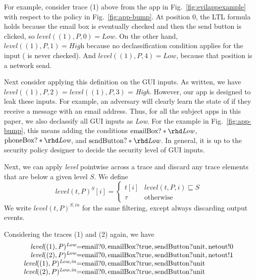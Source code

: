 \documentclass[10pt,conference,compsocconf]{IEEEtran}
\newcommand{\code}[1]{\text{\lstinline!#1!}}
\newcommand{\tr}{t\xspace}
\newcommand{\tlevel}[3]{\textit{level}(#1, #2, #3)}
\newcommand{\tleveltr}[2]{\textit{level}(#1, #2)}
\begin{document}
For example, consider trace (1) above from the app in
Fig.~\ref{fig:evilappexample} with respect to the policy in
Fig.~\ref{fig:app-bump}.  At position 0, the LTL formula holds because
the email box is eventually checked and then the send button is
clicked, so $\tlevel{(1)}{P}{0} = \textit{Low}$. On the other hand,
$\tlevel{(1)}{P}{1} = \textit{High}$ because no declassification
condition applies for the \code{phone} input (\code{phoneBox} is never
checked). And $\tlevel{(1)}{P}{4} = \textit{Low}$, because that
position is a network send.

Next consider applying this definition on the GUI inputs. As written,
we have $\tlevel{(1)}{P}{2}$ = $\tlevel{(1)}{P}{3}$ =
\textit{High}. However, our app is designed to leak these inputs. 
For example, an adversary will clearly learn the state of
\code{emailBox} if they receive a message with an email address. Thus,
for all the subject apps in this paper, we also declassify all GUI inputs as
\textit{Low}. 
For the example in Fig.~\ref{fig:app-bump}, this means
adding the conditions
$\code{emailBox?}\ast \rhd \textit{Low}$,
$\code{phoneBox?}\ast \rhd \textit{Low}$, and
$\code{sendButton?}\ast \rhd \textit{Low}$. In general, it is up to
the security policy designer to decide the security level of GUI inputs.

Next, we can apply \textit{level} pointwise across a trace and discard
any trace elements that are below a given level $S$. We define
\begin{displaymath}
\tleveltr{\tr}{P}^S[i] =
\begin{cases}
\tr[i] & \tlevel{\tr}{P}{i} \sqsubseteq S \\
\tau & \textrm{otherwise}
\end{cases}
\end{displaymath}
We write $\tleveltr{\tr}{P}^{S,in}$ for the same filtering, except
always discarding output events.

Considering the traces (1) and (2) again, we have
\begin{displaymath}
  \begin{array}{r@{ }c@{ }l}
    \tleveltr{(1)}{P}^\textit{Low} & = & \code{email}?0, \code{emailBox}?\code{true},
    \code{sendButton}?\code{unit}, \code{netout}!0 \\
    \tleveltr{(2)}{P}^\textit{Low} & = & \code{email}?0, \code{emailBox}?\code{true},
    \code{sendButton}?\code{unit}, \code{netout}!1 \\
    \tleveltr{(1)}{P}^\textit{Low,in} & = & \code{email}?0, \code{emailBox}?\code{true},
    \code{sendButton}?\code{unit} \\
    \tleveltr{(2)}{P}^\textit{Low,in} & = & \code{email}?0, \code{emailBox}?\code{true},
    \code{sendButton}?\code{unit} \\
  \end{array}
\end{displaymath}
\end{document}
